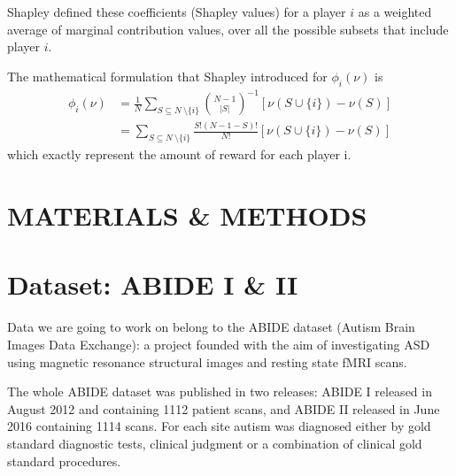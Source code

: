 \documentclass[11pt]{report}
\begin{document}
Shapley defined these coefficients (Shapley values) for a player $i$ as a weighted average of marginal contribution values, over all the possible subsets that include player $i$.

The mathematical formulation that Shapley introduced for $\phi_i(\nu)$ is
\begin{equation}
\begin{aligned}
\phi_i(\nu)  & = \frac{1}{N }\sum_{S\subseteq N\ \setminus \{ i \} }  {\binom{N- 1}{|S|}}^{-1} [\nu (S \cup \{ i \}) - \nu(S)] \\
& = \sum_{S\subseteq N\ \setminus \{ i \} }  \frac{S! (N-1-S)!}{N!} [\nu (S \cup \{ i \}) - \nu(S) ]
\end{aligned}
\end{equation}
which exactly represent the amount of reward for each player i.



\chapter*{MATERIALS \& METHODS}

\chapter{Dataset: ABIDE I \& II}\label{chap:dataset}


Data we are going to work on belong to the ABIDE dataset (Autism Brain Images Data Exchange): a project founded with the aim of investigating ASD using magnetic resonance structural images and resting state fMRI scans.

The whole ABIDE dataset was published in two releases: ABIDE I released in August 2012 and containing 1112 patient scans, and ABIDE II released in June 2016 containing 1114 scans.
For each site autism was diagnosed either by gold standard diagnostic tests, clinical judgment or a combination of clinical gold standard procedures.
\end{document}
